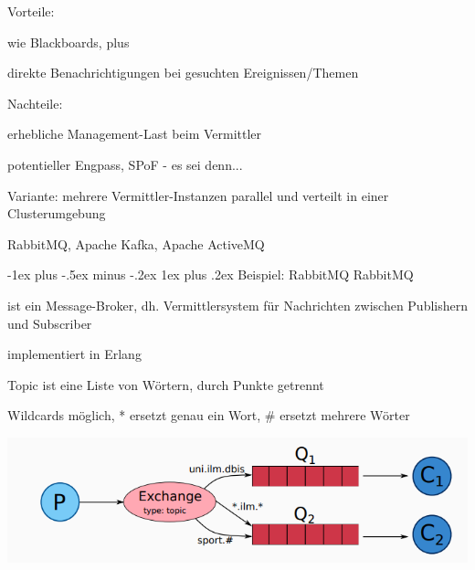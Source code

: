 \documentclass[10pt]{article}
\makeatletter
\renewcommand{\subsubsection}{\@startsection{subsubsection}{3}{0mm}%
                                {-1ex plus -.5ex minus -.2ex}%
                                {1ex plus .2ex}%
                                {\normalfont\small\bfseries}}
\makeatother
\begin{document}
\begin{itemize*}
  \item Vorteile:
  \begin{itemize*}
    \item wie Blackboards, plus
    \item direkte Benachrichtigungen bei gesuchten Ereignissen/Themen
  \end{itemize*}
  \item Nachteile:
  \begin{itemize*}
    \item erhebliche Management-Last beim Vermittler
    \begin{itemize*}
      \item potentieller Engpass, SPoF - es sei denn...
    \end{itemize*}
  \end{itemize*}
  Variante: mehrere Vermittler-Instanzen parallel und verteilt in einer Clusterumgebung
  \begin{itemize*}
    \item RabbitMQ, Apache Kafka, Apache ActiveMQ
  \end{itemize*}
\end{itemize*}

\subsubsection{Beispiel: RabbitMQ}
RabbitMQ
\begin{itemize*}
  \item ist ein Message-Broker, dh. Vermittlersystem für Nachrichten zwischen Publishern und Subscriber
  \item implementiert in Erlang
  \begin{itemize*}
    \item Topic ist eine Liste von Wörtern, durch Punkte getrennt
    \item Wildcards möglich, * ersetzt genau ein Wort, \# ersetzt mehrere Wörter
  \end{itemize*}
\end{itemize*}
\begin{center}
  \includegraphics[width=0.4\linewidth]{Assets/Programmierparadigmen-rabbitmq}
\end{center}
\end{document}
